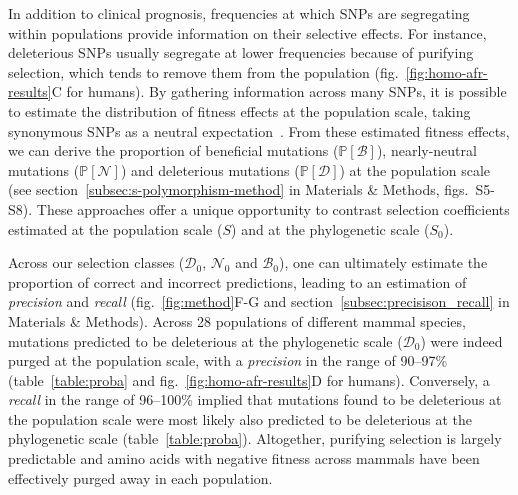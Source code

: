\documentclass{article}
\newcommand{\proba}{\mathbb{P}}
\newcommand{\Sphy}{S_{0}}
\newcommand{\SphyDel}{\mathcal{D}_0}
\newcommand{\SphyNeu}{\mathcal{N}_0}
\newcommand{\SphyBen}{\mathcal{B}_0}
\newcommand{\Spop}{S}
\newcommand{\SpopDel}{\mathcal{D}}
\newcommand{\SpopNeu}{\mathcal{N}}
\newcommand{\SpopBen}{\mathcal{B}}
\newcommand{\ProbaPopDel}{\proba [ \SpopDel]}
\newcommand{\ProbaPopNeu}{\proba [ \SpopNeu ]}
\newcommand{\ProbaPopBen}{\proba [ \SpopBen ]}
\begin{document}
    In addition to clinical prognosis, frequencies at which SNPs are segregating within populations provide information on their selective effects.
    For instance, deleterious SNPs usually segregate at lower frequencies because of purifying selection, which tends to remove them from the population (fig.~\ref{fig:homo-afr-results}C for humans).
    By gathering information across many SNPs, it is possible to estimate the distribution of fitness effects at the population scale, taking synonymous SNPs as a neutral expectation~\cite{eyre-walker_distribution_2006, eyre-walker_estimating_2009, galtier_adaptive_2016, tataru_inference_2017}.
    From these estimated fitness effects, we can derive the proportion of beneficial mutations ($\ProbaPopBen$), nearly-neutral mutations ($\ProbaPopNeu$) and deleterious mutations ($\ProbaPopDel$) at the population scale (see section~\ref{subsec:s-polymorphism-method} in Materials \& Methods, figs.~S5-S8).
    These approaches offer a unique opportunity to contrast selection coefficients estimated at the population scale ($\Spop$) and at the phylogenetic scale ($\Sphy$).

    Across our selection classes ($\SphyDel$, $\SphyNeu$ and $\SphyBen$), one can ultimately estimate the proportion of correct and incorrect predictions, leading to an estimation of \textit{precision} and \textit{recall} (fig.~\ref{fig:method}F-G and section~\ref{subsec:precisison_recall} in Materials \& Methods).
    Across 28 populations of different mammal species, mutations predicted to be deleterious at the phylogenetic scale ($\SphyDel$) were indeed purged at the population scale, with a \textit{precision} in the range of 90--97\% (table~\ref{table:proba} and fig.~\ref{fig:homo-afr-results}D for humans).
    Conversely, a \textit{recall} in the range of 96--100\% implied that mutations found to be deleterious at the population scale were most likely also predicted to be deleterious at the phylogenetic scale (table~\ref{table:proba}).
    Altogether, purifying selection is largely predictable and amino acids with negative fitness across mammals have been effectively purged away in each population.
\end{document}
